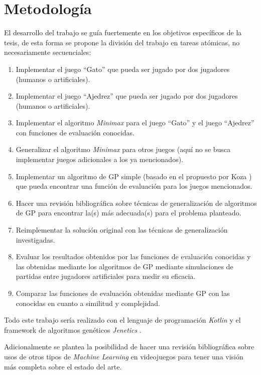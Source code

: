 \section{Metodología}
  El desarrollo del trabajo se guía fuertemente en los objetivos específicos de la tesis, de esta 
  forma se propone la división del trabajo en tareas atómicas, no necesariamente secuenciales:

  \begin{enumerate}
    \item Implementar el juego \enquote{Gato} que pueda ser jugado por dos jugadores (humanos o 
      artificiales).
    \item Implementar el juego \enquote{Ajedrez} que pueda ser jugado por dos jugadores (humanos o 
      artificiales).
    \item Implementar el algoritmo \textit{Minimax} para el juego \enquote{Gato} y el juego 
      \enquote{Ajedrez} con funciones de evaluación conocidas.
    \item Generalizar el algoritmo \textit{Minimax} para otros juegos (aquí no se busca implementar
      juegos adicionales a los ya mencionados).
    \item Implementar un algoritmo de GP simple (basado en el propuesto por Koza 
      \cite{kozaGeneticProgrammingMeans1994a}) que pueda encontrar una función de evaluación para
      los juegos mencionados.
    \item Hacer una revisión bibliográfica sobre técnicas de generalización de algoritmos de GP para 
      encontrar la(s) más adecuada(s) para el problema planteado.
    \item Reimplementar la solución original con las técnicas de generalización investigadas.
    \item Evaluar los resultados obtenidos por las funciones de evaluación conocidas y las obtenidas 
      mediante los algoritmos de GP mediante simulaciones de partidas entre jugadores artificiales
      para medir su eficacia.
    \item Comparar las funciones de evaluación obtenidas mediante GP con las conocidas en cuanto a
      similitud y complejidad.
  \end{enumerate}

  Todo este trabajo sería realizado con el lenguaje de programación \textit{Kotlin} 
  \cite{KotlinProgrammingLanguage} y el framework de algoritmos genéticos \textit{Jenetics} 
  \cite{wilhelmstotterJeneticsJavaGenetic}.

  Adicionalmente se plantea la posibilidad de hacer una revisión bibliográfica sobre usos de otros 
  tipos de \textit{Machine Learning} en videojuegos para tener una visión más completa sobre el 
  estado del arte.